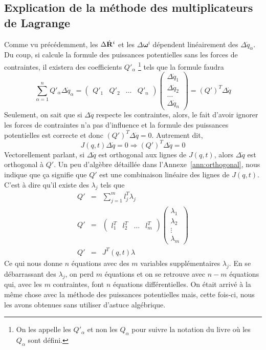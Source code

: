 \documentclass[11pt,a4paper]{article}
\newcommand\fvd[1]{\dot{\bf #1}} %
\newcommand\omegaf{{\bm \omega}}
\newcommand\xgd{\ensuremath{\fvd{R}}}
\newcommand\dqp{\Delta \dot{q}}
\begin{document}
\subsection{Explication de la méthode des multiplicateurs de Lagrange}
Comme vu précédemment, les $\Delta \xgd^i$ et les $\Delta \omegaf^i$ dépendent linéairement des $\dqp_\alpha$.
Du coup, si calcule la formule des puissances potentielles sans les forces de contraintes, il existera des coefficients $Q'_\alpha$
\footnote{On les appelle les $Q'_\alpha$ et non les $Q_\alpha$ pour suivre la notation du livre où les $Q_\alpha$ sont défini.}
tels que la formule faudra
\[ \sum_{\alpha = 1}^n Q'_\alpha \dqp_\alpha =
\begin{pmatrix}Q'_1 & Q'_2 & \ldots & Q'_n\end{pmatrix}\begin{pmatrix}\dqp_1\\\dqp_2\\\ldots\\\dqp_n\end{pmatrix}
= (Q')^T \dqp \]
Seulement, on sait que si $\dqp$ respecte les contraintes, alors, le fait d'avoir ignorer les forces de contraintes n'a pas d'influence et la formule des puissances potentielles est correcte et donc $(Q')^T \dqp = 0$.
Autrement dit,
\[ J(q, t) \dqp = 0 \Rightarrow (Q')^T \dqp = 0 \]
Vectorellement parlant, si $\dqp$ est orthogonal aux lignes de $J(q, t)$, alors $\dqp$ est orthogonal à $Q'$.
Un peu d'algèbre détaillée dans l'Annexe~\ref{ann:orthogonal}, nous indique que ça signifie que $Q'$ est une combinaison linéaire des lignes de $J(q, t)$.
C'est à dire qu'il existe des $\lambda_j$ tels que
\begin{eqnarray*}
	Q' &=& \sum_{j = 1}^m l_j^T \lambda_j\\
	Q' &=& \begin{pmatrix}l_1^T&l_2^T&\ldots&l_m^T\end{pmatrix} \begin{pmatrix}\lambda_1\\\lambda_2\\\vdots\\\lambda_m\end{pmatrix}\\
	Q' &=& J^T(q, t) \lambda
\end{eqnarray*}
Ce qui nous donne $n$ équations avec des $m$ variables supplémentaires $\lambda_j$.
En se débarrassant des $\lambda_j$, on perd $m$ équations et on se retrouve avec $n - m$ équations qui, avec les $m$ contraintes, font $n$ équations différentielles.
On était arrivé à la même chose avec la méthode des puissances potentielles mais, cette fois-ci, nous les avons obtenues sans utiliser d'astuce algébrique.
\end{document}
